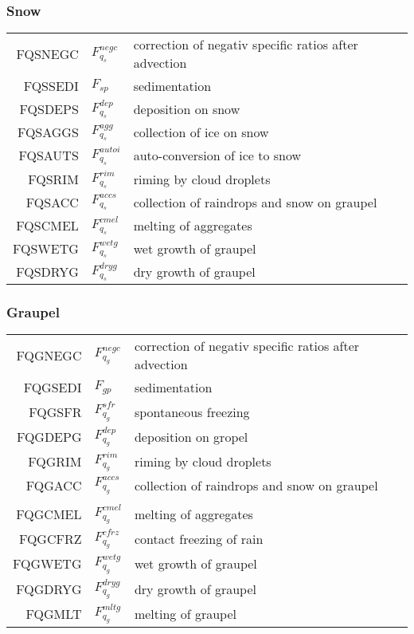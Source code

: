   \subsubsection{Snow}
  \begin{tabular}{rll}
       FQSNEGC      &$F_{q_s}^{negc}$ &correction of negativ specific ratios after advection\\
       FQSSEDI      &$F_{sp}$ &sedimentation\\
       FQSDEPS      &$F_{q_s}^{dep}$ &deposition on snow\\
       FQSAGGS      &$F_{q_s}^{agg}$ &collection of ice on snow\\
       FQSAUTS      &$F_{q_s}^{autoi}$  &auto-conversion of ice to snow\\
       FQSRIM       &$F_{q_s}^{rim}$ &riming by cloud droplets\\
       FQSACC       &$F_{q_s}^{accs}$ &collection of raindrops and snow on graupel\\
       FQSCMEL      &$F_{q_s}^{cmel}$ &melting of aggregates\\
       FQSWETG      &$F_{q_s}^{wetg}$ &wet growth of graupel\\
       FQSDRYG      &$F_{q_s}^{dryg}$ &dry growth of graupel\\
  \end{tabular}

  \subsubsection{Graupel}
  \begin{tabular}{rll}
       FQGNEGC      &$F_{q_g}^{negc}$ &correction of negativ specific ratios after advection\\
       FQGSEDI      &$F_{gp}$ &sedimentation\\
       FQGSFR       &$F_{q_g}^{sfr}$ &spontaneous freezing \\
       FQGDEPG      &$F_{q_g}^{dep}$  &deposition on gropel\\
       FQGRIM       &$F_{q_g}^{rim}$ &riming by cloud droplets\\
       FQGACC       &$F_{q_g}^{accs}$  &collection of raindrops and snow on graupel\\\\
       FQGCMEL      &$F_{q_g}^{cmel}$ &melting of aggregates\\
       FQGCFRZ      &$F_{q_g}^{cfrz}$ &contact freezing of rain\\
       FQGWETG      &$F_{q_g}^{wetg}$ &wet growth of graupel\\
       FQGDRYG      &$F_{q_g}^{dryg}$ &dry growth of graupel\\
       FQGMLT       &$F_{q_g}^{mltg}$ &melting of graupel\\

  \end{tabular}

